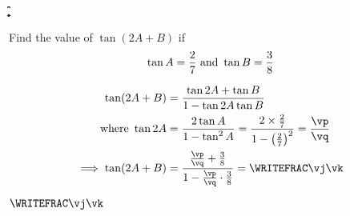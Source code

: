 

\FRACPOWER\va{}\ve\vf
{}\ve\vf\vx\vy
\FRACMULT\va{}\vg\vh
\FRACDIV\vg\vh\vx\vy\vp\vq

\FRACADD\vp\vq\vc\vd\a\b
\FRACMULT\vp\vq\vc\vd\c\d
{}\c\d\e\f
\FRACDIV\a\b\e\f\vj\vk

\question[2] Find the value of $\tan (2A+B)$ if 
 \[ \tan A = \frac{2}{7}\text{ and }\tan B = \frac{3}{8} \]

\watchout

\begin{solution}[\halfpage]
	\begin{align}
		\tan(2A+B) &= \dfrac{\tan 2A + \tan B}{1-\tan 2A\tan B} \\
		\text{where } \tan 2A &= \dfrac{2\tan A}{1-\tan^2 A} = 
    \dfrac{2\times \frac\va\vb}{1-\left(\frac\va\vb\right)^2} = \dfrac\vp\vq \\
		 \implies \tan(2A+B) &= \dfrac{\frac\vp\vq + \frac\vc\vd}{1-\frac\vp\vq\cdot\frac\vc\vd} = \WRITEFRAC\vj\vk
	\end{align}
\end{solution}
\ifprintanswers\begin{codex}$\WRITEFRAC\vj\vk$\end{codex}\fi
